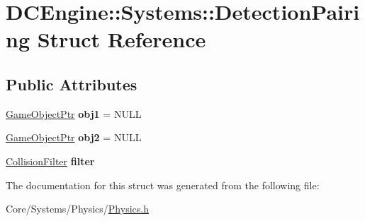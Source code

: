 \hypertarget{structDCEngine_1_1Systems_1_1DetectionPairing}{\section{D\-C\-Engine\-:\-:Systems\-:\-:Detection\-Pairing Struct Reference}
\label{structDCEngine_1_1Systems_1_1DetectionPairing}
}
\subsection*{Public Attributes}
\begin{DoxyCompactItemize}
\item 
\hypertarget{structDCEngine_1_1Systems_1_1DetectionPairing_a4c192316cec5bb95fcc4dae82033cf2f}{\hyperlink{classDCEngine_1_1GameObject}{Game\-Object\-Ptr} {\bfseries obj1} = N\-U\-L\-L}\label{structDCEngine_1_1Systems_1_1DetectionPairing_a4c192316cec5bb95fcc4dae82033cf2f}

\item 
\hypertarget{structDCEngine_1_1Systems_1_1DetectionPairing_ad51ad3626638180701a767d142578c55}{\hyperlink{classDCEngine_1_1GameObject}{Game\-Object\-Ptr} {\bfseries obj2} = N\-U\-L\-L}\label{structDCEngine_1_1Systems_1_1DetectionPairing_ad51ad3626638180701a767d142578c55}

\item 
\hypertarget{structDCEngine_1_1Systems_1_1DetectionPairing_a83f971b28cfa7393729a530ac4f95e94}{\hyperlink{structDCEngine_1_1CollisionFilter}{Collision\-Filter} {\bfseries filter}}\label{structDCEngine_1_1Systems_1_1DetectionPairing_a83f971b28cfa7393729a530ac4f95e94}

\end{DoxyCompactItemize}


The documentation for this struct was generated from the following file\-:\begin{DoxyCompactItemize}
\item 
Core/\-Systems/\-Physics/\hyperlink{Physics_8h}{Physics.\-h}\end{DoxyCompactItemize}
